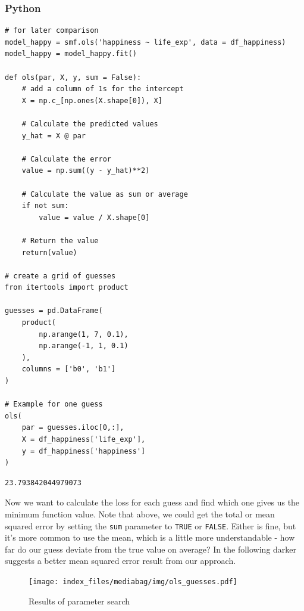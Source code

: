 \documentclass[
  letterpaper,
]{krantz}
\begin{document}
\subsubsection{Python}

\begin{verbatim}
# for later comparison
model_happy = smf.ols('happiness ~ life_exp', data = df_happiness)
model_happy = model_happy.fit()

def ols(par, X, y, sum = False):
    # add a column of 1s for the intercept
    X = np.c_[np.ones(X.shape[0]), X]

    # Calculate the predicted values
    y_hat = X @ par
    
    # Calculate the error
    value = np.sum((y - y_hat)**2)
    
    # Calculate the value as sum or average
    if not sum:
        value = value / X.shape[0]
    
    # Return the value
    return(value)

# create a grid of guesses
from itertools import product

guesses = pd.DataFrame(
    product(
        np.arange(1, 7, 0.1),
        np.arange(-1, 1, 0.1)
    ),
    columns = ['b0', 'b1']
)

# Example for one guess
ols(
    par = guesses.iloc[0,:],
    X = df_happiness['life_exp'],
    y = df_happiness['happiness']
)
\end{verbatim}

\begin{verbatim}
23.793842044979073
\end{verbatim}

Now we want to calculate the loss for each guess and find which one
gives us the minimum function value. Note that above, we could get the
total or mean squared error by setting the \texttt{sum} parameter to
\texttt{TRUE} or \texttt{FALSE}. Either is fine, but it's more common to
use the mean, which is a little more understandable - how far do our
guess deviate from the true value on average? In the following darker
suggests a better mean squared error result from our approach.

\begin{figure}[H]

{\centering \texttt{[image: index\_files/mediabag/img/ols\_guesses.pdf]}

}

\caption{Results of parameter search}

\end{figure}%
\end{document}
